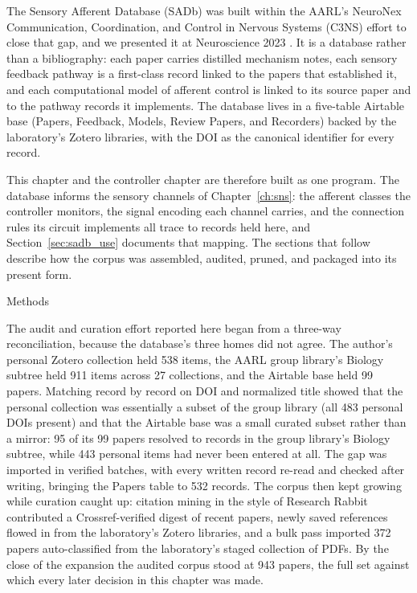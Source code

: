 The Sensory Afferent Database (SADb) was built within the AARL's NeuroNex Communication, Coordination, and Control in Nervous Systems (C3NS) effort to close that gap, and we presented it at Neuroscience 2023 \citep{bolen_sensory_2023}. It is a database rather than a bibliography: each paper carries distilled mechanism notes, each sensory feedback pathway is a first-class record linked to the papers that established it, and each computational model of afferent control is linked to its source paper and to the pathway records it implements. The database lives in a five-table Airtable base (Papers, Feedback, Models, Review Papers, and Recorders) backed by the laboratory's Zotero libraries, with the DOI as the canonical identifier for every record.

This chapter and the controller chapter are therefore built as one program. The database informs the sensory channels of Chapter~\ref{ch:sns}: the afferent classes the controller monitors, the signal encoding each channel carries, and the connection rules its circuit implements all trace to records held here, and Section~\ref{sec:sadb_use} documents that mapping. The sections that follow describe how the corpus was assembled, audited, pruned, and packaged into its present form.

Methods

The audit and curation effort reported here began from a three-way reconciliation, because the database's three homes did not agree. The author's personal Zotero collection held 538 items, the AARL group library's Biology subtree held 911 items across 27 collections, and the Airtable base held 99 papers. Matching record by record on DOI and normalized title showed that the personal collection was essentially a subset of the group library (all 483 personal DOIs present) and that the Airtable base was a small curated subset rather than a mirror: 95 of its 99 papers resolved to records in the group library's Biology subtree, while 443 personal items had never been entered at all. The gap was imported in verified batches, with every written record re-read and checked after writing, bringing the Papers table to 532 records. The corpus then kept growing while curation caught up: citation mining in the style of Research Rabbit contributed a Crossref-verified digest of recent papers, newly saved references flowed in from the laboratory's Zotero libraries, and a bulk pass imported 372 papers auto-classified from the laboratory's staged collection of PDFs. By the close of the expansion the audited corpus stood at 943 papers, the full set against which every later decision in this chapter was made.

